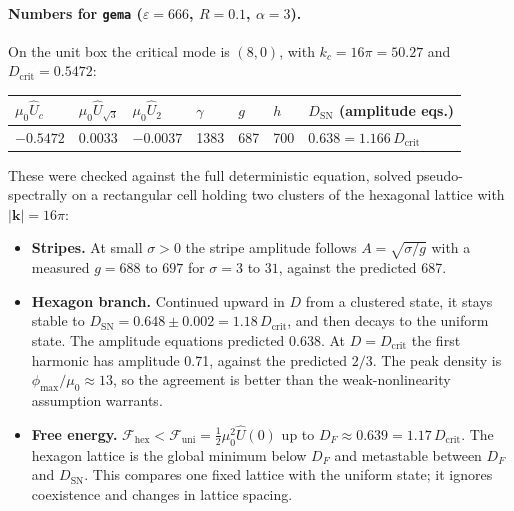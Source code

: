 \documentclass[11pt]{article}
\newcommand{\code}[1]{\texttt{#1}}
\newcommand{\Uh}{\hat U}
\begin{document}
\paragraph{Numbers for \code{gema} ($\varepsilon=666$, $R=0.1$, $\alpha=3$).}
On the unit box the critical mode is $(8,0)$, with $k_c = 16\pi = 50.27$ and
$D_{\mathrm{crit}} = 0.5472$:
\begin{center}
\begin{tabular}{@{}lllllll@{}}
\toprule
$\mu_0\Uh_c$ & $\mu_0\Uh_{\sqrt3}$ & $\mu_0\Uh_2$ & $\gamma$ & $g$ & $h$ & $D_{\mathrm{SN}}$ (amplitude eqs.) \\
\midrule
$-0.5472$ & $0.0033$ & $-0.0037$ & 1383 & 687 & 700 & $0.638 = 1.166\,D_{\mathrm{crit}}$ \\
\bottomrule
\end{tabular}
\end{center}
These were checked against the full deterministic equation, solved
pseudo-spectrally on a rectangular cell holding two clusters of the hexagonal
lattice with $|\mathbf k|=16\pi$:
\begin{itemize}
  \item \textbf{Stripes.} At small $\sigma>0$ the stripe amplitude follows
        $A=\sqrt{\sigma/g}$ with a measured $g = 688$ to $697$ for
        $\sigma = 3$ to $31$, against the predicted 687.
  \item \textbf{Hexagon branch.} Continued upward in $D$ from a clustered
        state, it stays stable to $D_{\mathrm{SN}} = 0.648\pm0.002 = 1.18\,D_{\mathrm{crit}}$, and then decays to the uniform state.
        The amplitude equations predicted 0.638. At $D=D_{\mathrm{crit}}$ the
        first harmonic has amplitude 0.71, against the predicted $2/3$. The
        peak density is $\phi_{\max}/\mu_0\approx13$, so the agreement is
        better than the weak-nonlinearity assumption warrants.
  \item \textbf{Free energy.} $\mathcal F_{\mathrm{hex}} < \mathcal F_{\mathrm{uni}}
        = \tfrac12\mu_0^2\Uh(0)$ up to $D_F\approx0.639 = 1.17\,D_{\mathrm{crit}}$. The hexagon lattice
        is the global minimum below $D_F$ and metastable between $D_F$ and
        $D_{\mathrm{SN}}$. This compares one fixed lattice with the uniform
        state; it ignores coexistence and changes in lattice spacing.
\end{itemize}
\end{document}
